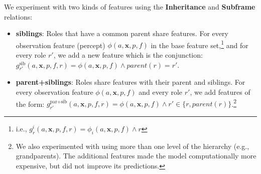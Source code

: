 \documentclass[11pt,a4paper]{article}
\newcommand{\exemplars}{\mathrm{ex}}
\newcommand{\fulltext}{\mathrm{ft}}
\newcommand{\ensuretext}[1]{#1}
\newcommand{\mkmarker}{\ensuretext{\textcolor{red}{\ensuremath{^{\textsc{M}}_{\textsc{K}}}}}}
\newcommand{\nasmarker}{\ensuretext{\textcolor{blue}{\ensuremath{^{\textsc{NA}}_{\textsc{S}}}}}}
\newcommand{\arkcomment}[3]{\ensuretext{\textcolor{#3}{[#1 #2]}}}
\newcommand{\mk}[1]{\arkcomment{\mkmarker}{#1}{red}}
\newcommand{\nascomment}[1]{\arkcomment{\nasmarker}{#1}{blue}}
\begin{document}
We experiment with two kinds of features using the \textbf{Inheritance} and \textbf{Subframe} relations:

\begin{itemize}
  \item 
\noindent\textbf{siblings}: Roles that have a common parent share features.
For every observation feature (percept) $\phi(a, \mathbf{x}, p, f)$ 
in the base feature set,\footnote{i.e., $g^i_r(a,\mathbf{x},p,f,r) = \phi_i(a,\mathbf{x},p,f) \wedge r$} 
and for every role $r'$,
we add a new feature which is the conjunction: 
$g^{\text{sib}}_{r'}(a,\mathbf{x},p,f,r) = \phi(a, \mathbf{x}, p, f) \wedge \textit{parent}(r)=r'$.  

  \item\noindent\textbf{parent+siblings}: Roles share features with their parent and siblings. 
For every observation feature $\phi(a, \mathbf{x}, p, f)$ and every role $r'$, we add features of the form:
$g^{\text{par+sib}}_{r'}(a,\mathbf{x},p,f,r) = \phi(a, \mathbf{x}, p, f) \wedge r' \in \{r, \textit{parent}(r)\}$.\footnote{We also experimented with using more than one level of the hierarchy (e.g., grandparents). 
The additional features made the model computationally more expensive, 
but did not improve its predictions.}
\end{itemize}




% 
\end{document}
